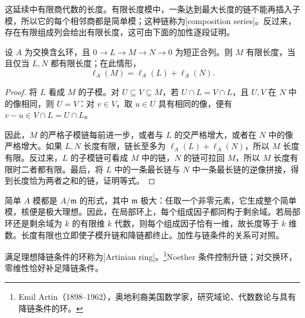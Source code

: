 这延续中有限商代数的长度。有限长度模中，一条达到最大长度的链不能再插入子模，所以它的每个相邻商都是简单模；这种链称为[composition series]。反过来，存在有限组成列会给出有限长度，这可由下面的加性逐段证明。

\begin{proposition}
\label{g5:prop:length-additivity}
	设 \(A\) 为交换含幺环，且 \(0\rightarrow L\rightarrow M\rightarrow N\rightarrow0\) 为短正合列。则 \(M\) 有限长度，当且仅当 \(L,N\) 都有限长度；在此情形，
	\[
		\ell_A(M)=\ell_A(L)+\ell_A(N).
	\]
\end{proposition}
\begin{proof}
	将 \(L\) 看成 \(M\) 的子模。对 \(U\subseteq V\subseteq M\)，若 \(U\cap L=V\cap L\)，且 \(U,V\) 在 \(N\) 中的像相同，则 \(U=V\)：对 \(v\in V\)，取 \(u\in U\) 具有相同的像，便有 \(v-u\in V\cap L=U\cap L\)。

	因此，\(M\) 的严格子模链每前进一步，或者与 \(L\) 的交严格增大，或者在 \(N\) 中的像严格增大。如果 \(L,N\) 长度有限，链长至多为 \(\ell_A(L)+\ell_A(N)\)，所以 \(M\) 长度有限。反过来，\(L\) 的子模链可看成 \(M\) 中的链，\(N\) 的链可拉回 \(M\)，所以 \(M\) 长度有限时二者都有限。最后，将 \(L\) 中的一条最长链与 \(N\) 中一条最长链的逆像拼接，得到长度恰为两者之和的链，证明等式。
\end{proof}

简单 \(A\) 模都是 \(A/\mathfrak m\) 的形式，其中 \(\mathfrak m\) 极大：任取一个非零元素，它生成整个简单模，核便是极大理想。因此，在局部环上，每个组成因子都同构于剩余域。若局部环还是剩余域为 \(k\) 的有限维 \(k\) 代数，则每个组成因子恰有一维，故长度等于 \(k\) 维数。长度有限也立即使子模升链和降链都终止。加性与链条件的关系可对照\cite[第3节，定理3.1及其后的讨论]{Matsumura1989}。

\ProseParagraphBreak

满足理想降链条件的环称为[Artinian ring]。\footnote{Emil Artin（1898--1962），奥地利裔美国数学家，研究域论、代数数论与具有降链条件的环。}Noether 条件控制升链；对交换环，零维性恰好补足降链条件。

